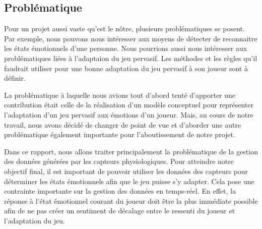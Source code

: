 \documentclass{article}
\begin{document}
	\subsection{Problématique}\label{sec:problematique}
		Pour un projet aussi vaste qu'est le nôtre, plusieurs problématiques se posent.
		Par exemple, nous pouvons nous intéresser aux moyens de détecter de reconnaitre les états émotionnels d'une personne.
		Nous pourrions aussi nous intéresser aux problématiques liées à l'adaptaion du jeu pervasif.
		Les méthodes et les règles qu'il faudrait utiliser pour une bonne adaptation du jeu pervasif à son joueur sont à définir.\par
		La problématique à laquelle nous avions tout d'abord tenté d'apporter une contribution était celle de la réalisation d'un modèle conceptuel pour représenter l'adaptation d'un jeu pervasif aux émotions d'un joueur.
		Mais, au cours de notre travail, nous avons décidé de changer de point de vue et  d'aborder une autre problématique également importante pour l'aboutissement de notre projet.\par
		Dans ce rapport, nous allons traiter principalement la problématique de la gestion des données générées par les capteurs physiologiques.
		Pour atteindre notre objectif final, il est important de pouvoir utiliser les données des capteurs pour déterminer les états émotionnels afin que le jeu puisse s'y adapter. 
		Cela pose une contrainte importante sur la gestion des données en temps-réel.
		En effet, la réponse à l'état émotionnel courant du joueur doit être la plus immédiate possible afin de ne pas créer un sentiment de décalage entre le ressenti du joueur et l'adaptation du jeu.
\end{document}
